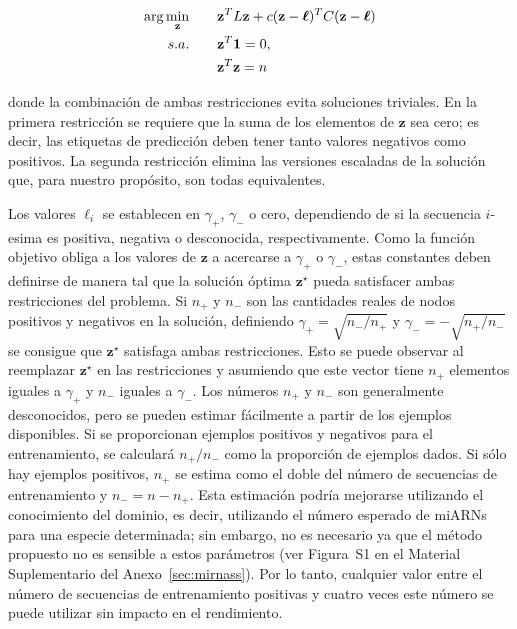 \begin{equation}
	\begin{split}
		\arg\min_{\mathbf{z}} & \qquad \mathbf{z}^TL\mathbf{z} +c(\mathbf{z}-\boldsymbol\ell)^TC(\mathbf{z}-\boldsymbol\ell) \\
		s.a. & \qquad \mathbf{z}^T\mathbf{1} = 0, \\
		     & \qquad \mathbf{z}^T\mathbf{z} = n
	\end{split}
\end{equation}

\noindent donde la combinación de ambas restricciones evita soluciones triviales. En la primera restricción se requiere que la suma de los elementos de
$\mathbf{z}$ sea cero; es decir, las etiquetas de predicción deben tener tanto valores negativos como positivos. La segunda restricción elimina las versiones
escaladas de la solución que, para nuestro propósito, son todas equivalentes.

Los valores $\ell_{i}$ se establecen en $\gamma_{+}$, $\gamma_{-}$ o cero, dependiendo de si la secuencia $ i $-esima es positiva, negativa o desconocida,
respectivamente. Como la función objetivo obliga a los valores de $\mathbf{z}$ a acercarse a $\gamma_{+}$ o $\gamma_{-}$, estas constantes deben definirse de
manera tal que la solución óptima $\mathbf{z}^\star$ pueda satisfacer ambas restricciones del problema. Si $n_{+}$ y $n_{-}$ son las cantidades reales de nodos
positivos y negativos en la solución, definiendo $\gamma_{+} = \sqrt{n_{-}/n_{+}}$ y $\gamma_{-}=-\sqrt{n_{+}/n_{-}}$ se consigue que $\mathbf{z}^\star$
satisfaga ambas restricciones. Esto se puede observar al reemplazar $\mathbf{z}^\star$ en las restricciones y asumiendo que este vector tiene $n_{+}$ elementos
iguales a $\gamma_{+}$ y $n_{-}$ iguales a $\gamma_{-}$. Los números $n_{+}$ y $n_{-}$ son generalmente desconocidos, pero se pueden estimar fácilmente a partir
de los ejemplos disponibles. Si se proporcionan ejemplos positivos y negativos para el entrenamiento, se calculará $n_{+}/n_{-}$ como la proporción de ejemplos
dados. Si sólo hay ejemplos positivos, $n_{+}$ se estima como el doble del número de secuencias de entrenamiento y $n_{-} = n - n_{+}$. Esta estimación podría
mejorarse utilizando el conocimiento del dominio, es decir, utilizando el número esperado de miARNs para una especie determinada; sin embargo, no es necesario
ya que el método propuesto no es sensible a estos parámetros (ver Figura~S1 en el Material Suplementario del Anexo~\ref{sec:mirnass}). Por lo tanto, cualquier
valor entre el número de secuencias de entrenamiento positivas y cuatro veces este número se puede utilizar sin impacto en el rendimiento.


